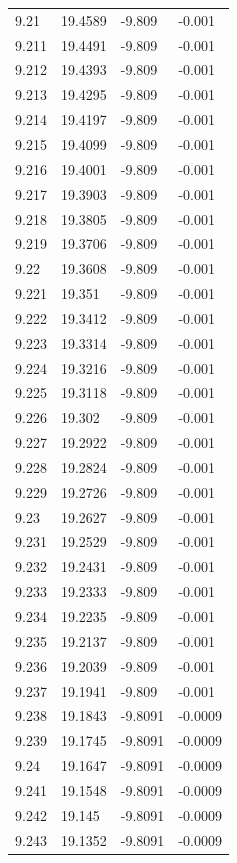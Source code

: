 \begin{tabular}{llll}
9.21 & 19.4589 & -9.809 & -0.001 \\
9.211 & 19.4491 & -9.809 & -0.001 \\
9.212 & 19.4393 & -9.809 & -0.001 \\
9.213 & 19.4295 & -9.809 & -0.001 \\
9.214 & 19.4197 & -9.809 & -0.001 \\
9.215 & 19.4099 & -9.809 & -0.001 \\
9.216 & 19.4001 & -9.809 & -0.001 \\
9.217 & 19.3903 & -9.809 & -0.001 \\
9.218 & 19.3805 & -9.809 & -0.001 \\
9.219 & 19.3706 & -9.809 & -0.001 \\
9.22 & 19.3608 & -9.809 & -0.001 \\
9.221 & 19.351 & -9.809 & -0.001 \\
9.222 & 19.3412 & -9.809 & -0.001 \\
9.223 & 19.3314 & -9.809 & -0.001 \\
9.224 & 19.3216 & -9.809 & -0.001 \\
9.225 & 19.3118 & -9.809 & -0.001 \\
9.226 & 19.302 & -9.809 & -0.001 \\
9.227 & 19.2922 & -9.809 & -0.001 \\
9.228 & 19.2824 & -9.809 & -0.001 \\
9.229 & 19.2726 & -9.809 & -0.001 \\
9.23 & 19.2627 & -9.809 & -0.001 \\
9.231 & 19.2529 & -9.809 & -0.001 \\
9.232 & 19.2431 & -9.809 & -0.001 \\
9.233 & 19.2333 & -9.809 & -0.001 \\
9.234 & 19.2235 & -9.809 & -0.001 \\
9.235 & 19.2137 & -9.809 & -0.001 \\
9.236 & 19.2039 & -9.809 & -0.001 \\
9.237 & 19.1941 & -9.809 & -0.001 \\
9.238 & 19.1843 & -9.8091 & -0.0009 \\
9.239 & 19.1745 & -9.8091 & -0.0009 \\
9.24 & 19.1647 & -9.8091 & -0.0009 \\
9.241 & 19.1548 & -9.8091 & -0.0009 \\
9.242 & 19.145 & -9.8091 & -0.0009 \\
9.243 & 19.1352 & -9.8091 & -0.0009 \\

\end{tabular}
